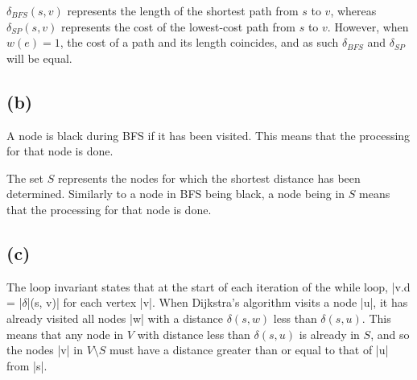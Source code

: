 \documentclass[a4paper]{article}
\begin{document}
\(\delta_{BFS}(s, v)\) represents the length of the shortest path from \(s\) to \(v\), whereas \(\delta_{SP}(s, v)\) represents the cost of the lowest-cost path from \(s\) to \(v\). However, when \(w(e) = 1\), the cost of a path and its length coincides, and as such \(\delta_{BFS}\) and \(\delta_{SP}\) will be equal.

\subsection*{(b)}

A node is black during BFS if it has been visited. This means that the processing for that node is done.

The set \(S\) represents the nodes for which the shortest distance has been determined. Similarly to a node in BFS being black, a node being in \(S\) means that the processing for that node is done.

\subsection*{(c)}

The loop invariant states that at the start of each iteration of the while loop, \code|v.d = |\(\delta\)\code|(s, v)| for each vertex \code|v|. When Dijkstra's algorithm visits a node \code|u|, it has already visited all nodes \code|w| with a distance \(\delta(s, w)\) less than \(\delta(s, u)\). This means that any node in \(V\) with distance less than \(\delta(s, u)\) is already in \(S\), and so the nodes \code|v| in \(V \setminus S\) must have a distance greater than or equal to that of \code|u| from \code|s|.
\end{document}
